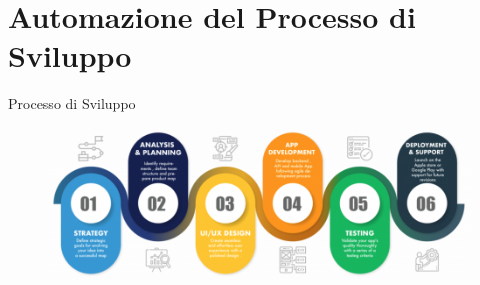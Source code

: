 
\section{Automazione del Processo di Sviluppo}

\begin{frame}{Processo di Sviluppo}

    \begin{figure}[H]
        \includegraphics[width=1\textwidth]{img/sdlc2.png}
    \end{figure}

\end{frame}

